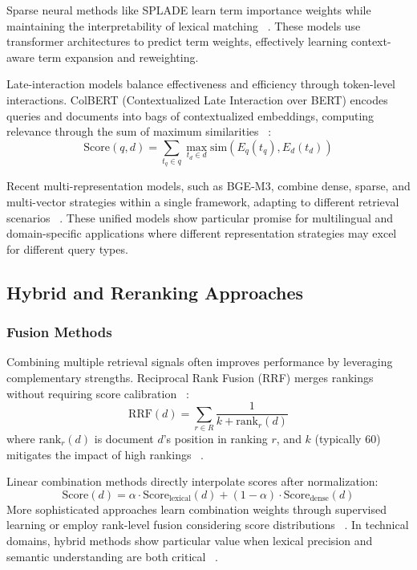 \documentclass[preprint,12pt]{elsarticle}
\begin{document}
Sparse neural methods like SPLADE learn term importance weights while maintaining the interpretability of lexical matching ~\cite{formal2021splade}. These models use transformer architectures to predict term weights, effectively learning context-aware term expansion and reweighting.

Late-interaction models balance effectiveness and efficiency through token-level interactions. ColBERT (Contextualized Late Interaction over BERT) encodes queries and documents into bags of contextualized embeddings, computing relevance through the sum of maximum similarities ~\cite{khattab2020colbert}:
\begin{equation}
\text{Score}(q,d) = \sum_{t_q \in q} \max_{t_d \in d} \text{sim}(E_q(t_q), E_d(t_d))
\end{equation}

Recent multi-representation models, such as BGE-M3, combine dense, sparse, and multi-vector strategies within a single framework, adapting to different retrieval scenarios ~\cite{chen2024bge}. These unified models show particular promise for multilingual and domain-specific applications where different representation strategies may excel for different query types.

\subsection{Hybrid and Reranking Approaches}

\subsubsection{Fusion Methods}

Combining multiple retrieval signals often improves performance by leveraging complementary strengths. Reciprocal Rank Fusion (RRF) merges rankings without requiring score calibration ~\cite{cormack2009reciprocal}:
\begin{equation}
\text{RRF}(d) = \sum_{r \in R} \frac{1}{k + \text{rank}_r(d)}
\end{equation}
where $\text{rank}_r(d)$ is document $d$'s position in ranking $r$, and $k$ (typically 60) mitigates the impact of high rankings ~\cite{lin2021pretrained}.

Linear combination methods directly interpolate scores after normalization:
\begin{equation}
\text{Score}(d) = \alpha \cdot \text{Score}_{\text{lexical}}(d) + (1-\alpha) \cdot \text{Score}_{\text{dense}}(d)
\end{equation}
More sophisticated approaches learn combination weights through supervised learning or employ rank-level fusion considering score distributions ~\cite{macdonald2013learning}. In technical domains, hybrid methods show particular value when lexical precision and semantic understanding are both critical ~\cite{lin2021pretrained}.
\end{document}
